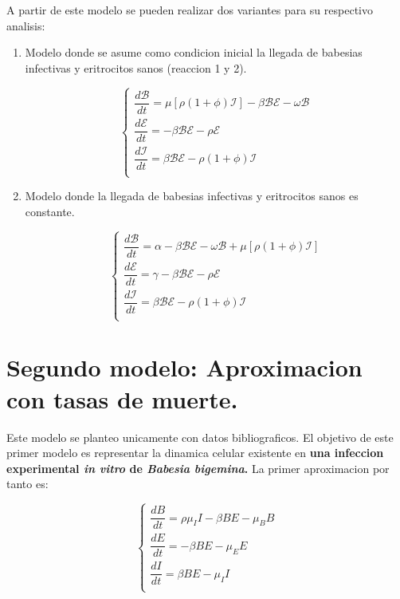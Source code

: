 \documentclass[11pt,a4paper]{article}
\begin{document}
A partir de este modelo se pueden realizar dos variantes para su respectivo analisis:

\begin{enumerate}
\item Modelo donde se asume como condicion inicial la llegada de babesias infectivas y eritrocitos sanos (reaccion 1 y 2).

\begin{equation} 
\left\{\begin{array}{l}
\dfrac{d\mathscr{B}}{dt}
=
\mu [\rho(1+\phi ) \mathscr{I}] - \beta \mathscr{B}\mathscr{E} - \omega \mathscr{B} 
\\
\dfrac{d\mathscr{E}}{dt}
=
 - \beta \mathscr{B}\mathscr{E} -\rho \mathscr{E} 
\\
\dfrac{d\mathscr{I}}{dt}
=
\beta \mathscr{B}\mathscr{E} - \rho (1+\phi )\mathscr{I}
\\
    \end{array}\right.
\end{equation}

\item Modelo donde la llegada de babesias infectivas y eritrocitos sanos es constante.

\begin{equation} 
\left\{\begin{array}{l}
\dfrac{d\mathscr{B}}{dt}
=
\alpha- \beta \mathscr{B}\mathscr{E} - \omega \mathscr{B} + \mu [\rho(1+\phi ) \mathscr{I}]
\\
\dfrac{d\mathscr{E}}{dt}
=
\gamma- \beta \mathscr{B}\mathscr{E} -\rho \mathscr{E} 
\\
\dfrac{d\mathscr{I}}{dt}
=
\beta \mathscr{B}\mathscr{E} - \rho (1+\phi )\mathscr{I}
\\
    \end{array}\right.
\end{equation}
\end{enumerate}
\section{Segundo modelo: Aproximacion con tasas de muerte.}

Este modelo se planteo unicamente con datos bibliograficos. El objetivo de este primer modelo es representar la dinamica celular existente en \textbf{una infeccion experimental \textit{in vitro} de \textit{Babesia bigemina}.} La primer aproximacion por tanto es:

\begin{equation} 
\left\{\begin{array}{l}
\dfrac{dB}{dt}
=
\rho \mu_I I - \beta BE - \mu_B B 
\\
\dfrac{dE}{dt}
=
- \beta BE -\mu_E E 
\\
\dfrac{dI}{dt}
=
\beta BE - \mu_I I
\\
    \end{array}\right.
\end{equation}
\end{document}
